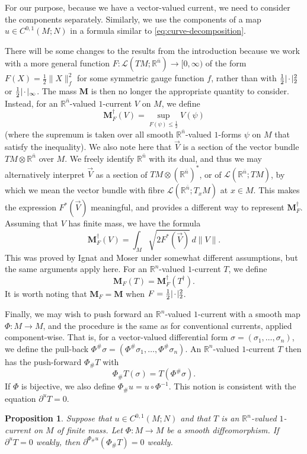 \documentclass[10pt,a4paper]{amsart}
\newcommand{\R}{\mathbb{R}}
\newcommand{\M}{\mathbf{M}}
\newcommand{\ndim}{{\bar{n}}}
\newcommand{\Lin}{\mathcal{L}}
\newcommand{\blank}{{\mkern 2mu\cdot\mkern 2mu}}
\newtheorem{proposition}[theorem]{Proposition}
\begin{document}
For our purpose, because we have a vector-valued current, we need to consider the
components separately. Similarly, we use the components of a map $u \in C^{0, 1}(M; N)$ in a formula similar to \eqref{eq:curve-decomposition}.

There will be some changes to the results from the introduction
because we work with a more general function
$F \colon \Lin(TM; \R^\ndim) \to [0, \infty)$ of the
form $F(X) = \frac{1}{2}\|X\|_f^2$ for some symmetric gauge function $f$,
rather than with $\frac{1}{2}|\blank|_2^2$ or $\frac{1}{2} |\blank|_\infty$.
The mass $\M$ is then no longer the appropriate quantity to consider. Instead, for an $\R^\ndim$-valued $1$-current $V$ on $M$, we define
\[
\M_F^\dagger(V) = \sup_{F(\psi) \le \frac{1}{2}} V(\psi)
\]
(where the supremum is taken over all smooth $\R^\ndim$-valued $1$-forms $\psi$
on $M$ that satisfy the inequality).
We also note here that $\vec{V}$ is a section of the vector bundle
$TM \otimes \R^\ndim$ over $M$. We freely identify $\R^\ndim$ with its dual,
and thus we may alternatively interpret $\vec{V}$ as a section of
$TM \otimes (\R^\ndim)^*$, or of $\Lin(\R^\ndim; TM)$, by which we mean
the vector bundle with fibre $\Lin(\R^\ndim; T_xM)$ at $x \in M$.
This makes the expression $F^*(\vec{V})$ meaningful, and provides
a different way to represent $\M_F^\dagger$. Assuming that $V$ has finite mass,
we have the formula
\begin{equation} \label{eq:F-mass}
\M_F^\dagger(V) = \int_M \sqrt{2 F^*(\vec{V})} \, d\|V\|.
\end{equation}
This was proved by Ignat and Moser \cite{Ignat-Moser:25} under somewhat different assumptions, but the same arguments apply here. For an $\R^n$-valued $1$-current $T$, we define
\[
\M_F(T) = \M_F^\dagger(T^\dagger).
\]
It is worth noting that $\M_F = \M$ when $F = \frac{1}{2} |\blank|_2^2$.

Finally, we may wish to push forward an $\R^n$-valued $1$-current with a smooth map $\Phi \colon M \to M$, and the procedure is the same as for conventional currents, applied component-wise. That is, for a vector-valued differential form $\sigma = (\sigma_1, \dotsc, \sigma_n)$, we define the pull-back $\Phi^\# \sigma = (\Phi^\# \sigma_1, \dotsc, \Phi^\# \sigma_n)$. An $\R^n$-valued $1$-current $T$ then has the push-forward $\Phi_\# T$ with
\[
\Phi_\# T(\sigma) = T(\Phi^\# \sigma).
\]
If $\Phi$ is bijective, we also define $\Phi_\# u = u \circ \Phi^{-1}$.
This notion is consistent with the equation $\partial^u T = 0$.

\begin{proposition} \label{prp:push-forward}
Suppose that $u \in C^{0, 1}(M; N)$ and that $T$ is an $\R^n$-valued $1$-current on $M$ of finite mass. Let $\Phi \colon M \to M$ be a smooth diffeomorphism. If $\partial^u T = 0$ weakly, then $\partial^{\Phi_\# u} (\Phi_\# T) = 0$ weakly.
\end{proposition}
\end{document}
